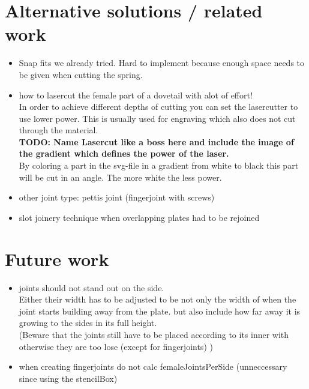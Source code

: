 \documentclass[../ClassicThesis.tex]{subfiles}
\begin{document}
\section{Alternative solutions / related work}
    \begin{itemize}
        \item Snap fits we already tried. Hard to implement because enough space needs to be given when cutting the spring.
        \item how to lasercut the female part of a dovetail with alot of effort!\\
        In order to achieve different depths of cutting you can set the lasercutter to use lower power. This is usually used for engraving which also does not cut through the material.\\  
        \textbf{TODO: Name Lasercut like a boss here and include the image of the gradient which defines the power of the laser.}\\
        By coloring a part in the svg-file in a gradient from white to black this part will be cut in an angle. The more white the less power.
        \item other joint type: pettis joint (fingerjoint with screws)
        \item slot joinery technique when overlapping plates had to be rejoined
    \end{itemize}
    
    
    
\section{Future work}
    \begin{itemize}
        \item joints should not stand out on the side. \\
        Either their width has to be adjusted to be not only the width of when the joint starts building away from the plate. but also include how far away it is growing to the sides in its full height. \\
    (Beware that the joints still have to be placed according to its inner with otherwise they are too lose (except for fingerjoints) )
        \item when creating fingerjoints do not calc femaleJointsPerSide (unneccessary since using the stencilBox)
    \end{itemize}
\end{document}
